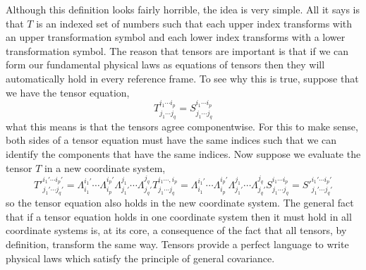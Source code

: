 \documentclass[11pt, a4paper]{article}
\begin{document}
Although this definition looks fairly horrible, the idea is very simple. All it says is that $T$ is an indexed set of numbers such that each upper index transforms with an upper transformation symbol and each lower index transforms with a lower transformation symbol. The reason that tensors are important is that if we can form our fundamental physical laws as equations of tensors then they will automatically hold in every reference frame. To see why this is true, suppose that we have the tensor equation, 
\[T^{i_1 \cdots i_p}_{j_1 \cdots j_q} = S^{i_1 \cdots i_p}_{j_1 \cdots j_q}\]
what this means is that the tensors agree componentwise. For this to make sense, both sides of a tensor equation must have the same indices such that we can identify the components that have the same indices. Now suppose we evaluate the tensor $T$ in a new coordinate system,
\[ T'^{i_1' \cdots i_p'}_{j_1' \cdots j_q'} = \Lambda^{i_1'}_{i_1} \cdots \Lambda^{i_p'}_{i_p} \Lambda^{j_1}_{j_1'} \cdots \Lambda^{j_q}_{j_q'} T^{i_1 \cdots, i_p}_{j_1 \cdots j_q} = \Lambda^{i_1'}_{i_1} \cdots \Lambda^{i_p'}_{i_p} \Lambda^{j_1}_{j_1'} \cdots \Lambda^{j_q}_{j_q'} S^{i_1 \cdots i_p}_{j_1 \cdots j_q} = S'^{i_1' \cdots i_p'}_{j_1' \cdots j_q'} \]
so the tensor equation also holds in the new coordinate system. The general fact that if a tensor equation holds in one coordinate system then it must hold in all coordinate systems is, at its core, a consequence of the fact that all tensors, by definition, transform the same way. Tensors provide a perfect language to write physical laws which satisfy the principle of general covariance.  
\end{document}
